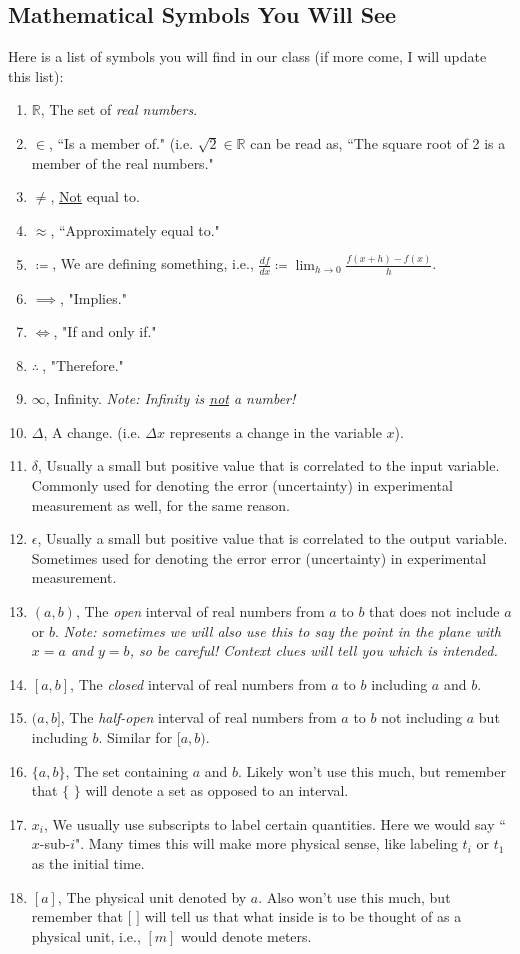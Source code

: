 \documentclass[leqno]{article}
\theoremstyle{definition}
\theoremstyle{remark}
\theoremstyle{theorem}
\newcommand{\R}{\mathbb{R}}
\begin{document}
\subsection{Mathematical Symbols You Will See}

Here is a list of symbols you will find in our class (if more come, I will update this list):

\begin{enumerate}[1.]
\item $\R$, The set of \emph{real numbers}.
\item $\in$, ``Is a member of." (i.e. $\sqrt{2}\in \R$ can be read as, ``The square root of 2 is a member of the real numbers."
\item $\neq$, \underline{Not} equal to.
\item $\approx$, ``Approximately equal to."
\item $\coloneqq$, We are defining something, i.e., $\frac{df}{dx}\coloneqq \lim_{h\to 0}\frac{f(x+h)-f(x)}{h}$.
\item $\implies$, "Implies."
\item $\iff$, "If and only if."
\item $\therefore~$, "Therefore."
\item $\infty$, Infinity.  \emph{Note: Infinity is \underline{not} a number!}
\item $\Delta$, A change. (i.e. $\Delta x$ represents a change in the variable $x$).
\item $\delta$, Usually a small but positive value that is correlated to the input variable. Commonly used for denoting the error (uncertainty) in experimental measurement as well, for the same reason.
\item $\epsilon$, Usually a small but positive value that is correlated to the output variable. Sometimes used for denoting the error error (uncertainty) in experimental measurement.
\item $(a,b)$, The \emph{open} interval of real numbers from $a$ to $b$ that does not include $a$ or $b$. \emph{Note: sometimes we will also use this to say the point in the plane with $x=a$ and $y=b$, so be careful! Context clues will tell you which is intended.}
\item $[a,b]$, The \emph{closed} interval of real numbers from $a$ to $b$ including $a$ and $b$.
\item $(a,b]$, The \emph{half-open} interval of real numbers from $a$ to $b$ not including $a$ but including $b$. Similar for $[a,b)$.
\item $\{a,b\}$, The set containing $a$ and $b$. Likely won't use this much, but remember that $\{$ $\}$ will denote a set as opposed to an interval.
\item $x_i$, We usually use subscripts to label certain quantities.  Here we would say ``$x$-sub-$i$".  Many times this will make more physical sense, like labeling $t_i$ or $t_1$ as the initial time.
\item $[a]$, The physical unit denoted by $a$. Also won't use this much, but remember that $[$ $]$ will tell us that what inside is to be thought of as a physical unit, i.e., $[m]$ would denote meters.
\end{enumerate}
\end{document}
